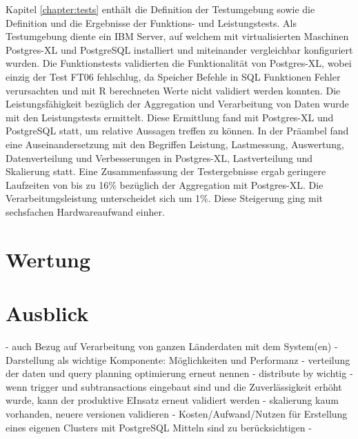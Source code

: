 Kapitel \ref{chapter:tests} enthält die Definition der Testumgebung sowie die Definition und die Ergebnisse der Funktions- und Leistungstests.
Als Testumgebung diente ein IBM Server, auf welchem mit virtualisierten Maschinen Postgres-XL und PostgreSQL installiert und miteinander vergleichbar konfiguriert wurden.
Die Funktionstests validierten die Funktionalität von Postgres-XL, wobei einzig der Test FT06 fehlschlug, da Speicher Befehle in SQL Funktionen Fehler verursachten und mit R berechneten Werte nicht validiert werden konnten.
Die Leistungsfähigkeit bezüglich der Aggregation und Verarbeitung von Daten wurde mit den Leistungstests ermittelt.
Diese Ermittlung fand mit Postgres-XL und PostgreSQL statt, um relative Aussagen treffen zu können.
In der Präambel fand eine Auseinandersetzung mit den Begriffen Leistung, Lastmessung, Auswertung, Datenverteilung und Verbesserungen in Postgres-XL, Lastverteilung und Skalierung statt.
Eine Zusammenfassung der Testergebnisse ergab geringere Laufzeiten von bis zu 16\%{} bezüglich der Aggregation mit Postgres-XL.
Die Verarbeitungsleistung unterscheidet sich um 1\%{}.
Diese Steigerung ging mit sechsfachen Hardwareaufwand einher.

\section{Wertung}

\section{Ausblick}

- auch Bezug auf Verarbeitung von ganzen Länderdaten mit dem System(en)
- Darstellung als wichtige Komponente: Möglichkeiten und Performanz
- verteilung der daten und query planning optimierung erneut nennen
- distribute by wichtig
- wenn trigger und subtransactions eingebaut sind und die Zuverlässigkeit erhöht wurde, kann der produktive EInsatz erneut validiert werden
- skalierung kaum vorhanden, neuere versionen validieren
- Kosten/Aufwand/Nutzen für Erstellung eines eigenen Clusters mit PostgreSQL Mitteln sind zu berücksichtigen
- 



\label{LastPage}